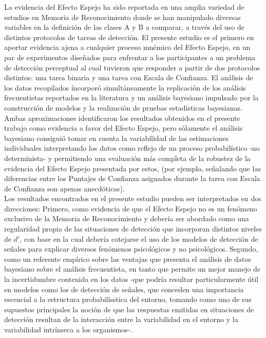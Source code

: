 La evidencia del Efecto Espejo ha sido reportada en una amplia variedad de estudios en Memoria de Reconocimiento donde se han manipulado diversas variables en la definición de las clases A y B a comparar, a través del uso de distintos protocolos de tareas de detección. El presente estudio es el primero en aportar evidencia ajena a cualquier proceso mnémico del Efecto Espejo, en un par de experimentos diseñados para enfrentar a los participantes a un problema de detección perceptual al cual tuvieron que responder a partir de dos protocolos distintos: una tarea binaria y una tarea con Escala de Confianza. El análisis de los datos recopilados íncorporó simultáneamente la replicación de los análisis frecuentistas reportados en la literatura y un análisis bayesiano impulsado por la construcción de modelos y la realización de pruebas estadísticas bayesianas. Ambas aproximaciones identificaron los resultados obtenidos en el presente trabajo como evidencia a favor del Efecto Espejo, pero sólamente el análisis bayesiano  consiguió tomar en cuenta la variabilidad de las estimaciones individuales interpretando los datos como reflejo de un proceso probabilístico -no determinista- y permitiendo una evaluación más completa de la robustez de la evidencia del Efecto Espejo presentada por estos, (por ejemplo, señalando que las diferencias entre los Puntajes de Confianza asignados durante la tarea con Escala de Confianza son apenas anecdóticas).\\

Los resultados encontrados en el presente estudio pueden ser interpretados en dos direcciones: Primero, como evidencia de que el Efecto Espejo no es un fenómeno exclusivo de la Memoria de Reconocimiento y debería ser abordado como una regularidad propia de las situaciones de detección que incorporan distintos niveles de $d'$, con base en la cual debería cotejarse el uso de los modelos de detección de señales para explicar diversos fenómenos psicológicos y no psicológicos. Segundo, como un referente empírico sobre las ventajas que presenta el análisis de datos bayesiano sobre el análisis frecuentista, en tanto que permite un mejor manejo de la incertidumbre contenida en los datos -que podría resultar particularmente útil en modelos como los de detección de señales, que conceden una importancia escencial a la estructura probabilísstica del entorno, tomando como uno de sus supuestos principales la noción de que las respuestas emitidas en situaciones de detección resultan de la interacción entre la variabilidad en el entorno y la variabilidad intrínseca a los organismos-.\\
